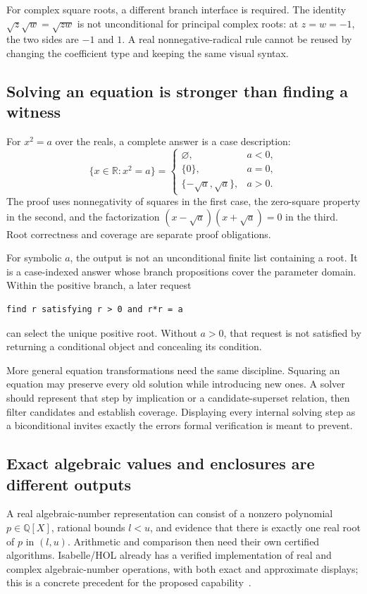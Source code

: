 \documentclass[11pt,a4paper]{article}
\newcommand{\Q}{\mathbb Q}
\newcommand{\R}{\mathbb R}
\theoremstyle{definition}
\begin{document}
For complex square roots, a different branch interface is required. The identity \(\sqrt z\sqrt w=\sqrt{zw}\) is not unconditional for principal complex roots: at \(z=w=-1\), the two sides are \(-1\) and \(1\). A real nonnegative-radical rule cannot be reused by changing the coefficient type and keeping the same visual syntax.

\subsection{Solving an equation is stronger than finding a witness}
For \(x^2=a\) over the reals, a complete answer is a case description:
\[
 \{x\in\R:x^2=a\}=
 \begin{cases}
   \varnothing,&a<0,\\
   \{0\},&a=0,\\
   \{-\sqrt a,\sqrt a\},&a>0.
 \end{cases}
\]
The proof uses nonnegativity of squares in the first case, the zero-square property in the second, and the factorization
\((x-\sqrt a)(x+\sqrt a)=0\) in the third. Root correctness and coverage are separate proof obligations.

For symbolic \(a\), the output is not an unconditional finite list containing a root. It is a case-indexed answer whose branch propositions cover the parameter domain. Within the positive branch, a later request
\par\noindent\begin{minipage}{\linewidth}
\begin{lstlisting}
find r satisfying r > 0 and r*r = a
\end{lstlisting}
\end{minipage}\par
can select the unique positive root. Without \(a>0\), that request is not satisfied by returning a conditional object and concealing its condition.

More general equation transformations need the same discipline. Squaring an equation may preserve every old solution while introducing new ones. A solver should represent that step by implication or a candidate-superset relation, then filter candidates and establish coverage. Displaying every internal solving step as a biconditional invites exactly the errors formal verification is meant to prevent.

\subsection{Exact algebraic values and enclosures are different outputs}
A real algebraic-number representation can consist of a nonzero polynomial \(p\in\Q[X]\), rational bounds \(l<u\), and evidence that there is exactly one real root of \(p\) in \((l,u)\). Arithmetic and comparison then need their own certified algorithms. Isabelle/HOL already has a verified implementation of real and complex algebraic-number operations, with both exact and approximate displays; this is a concrete precedent for the proposed capability~\cite{algnums}.
\end{document}
